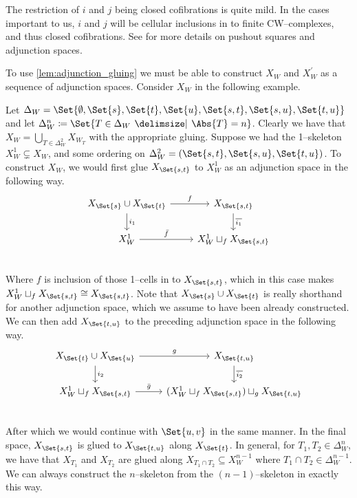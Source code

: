 \documentclass[class=article, crop=false]{standalone}
\begin{document}
The restriction of $i$ and $j$ being closed cofibrations is quite mild. In the cases important to us, $i$ and $j$ will be cellular inclusions in to finite CW--complexes, and thus closed cofibrations. See \cite{brown_topology_2006} for more details on pushout squares and adjunction spaces.

To use \cref{lem:adjunction_gluing} we must be able to construct $X_W$ and $X_W^\prime$ as a sequence of adjunction spaces. Consider $X_W$ in the following example.

\begin{example}
    \label{eg:inductive_construction}
    Let $\Delta_W = \Set{\emptyset, \Set{s}, \Set{t}, \Set{u}, \Set{s,t}, \Set{s,u}, \Set{t,u}}$ and let $\Delta_W^n \coloneq \Set{T \in \Delta_W \given \Abs{T} = n }$. Clearly we have that $X_W = \bigcup_{T \in \Delta_W^2} X_{W_T}$ with the appropriate gluing. Suppose we had the 1--skeleton $X^1_W \subsetneq X_W$, and some ordering on $\Delta_W^2 = (\Set{s,t}, \Set{s,u}, \Set{t,u})$. To construct $X_W$, we would first glue $X_{\Set{s,t}}$ to $X_W^1$ as an adjunction space in the following way.
    \begin{equation*}
        \begin{tikzcd}
                X_{\Set{s}} \cup X_{\Set{t}} \ar[r, "f" ] \ar[d, "i_1"]   &   X_{\Set{s,t}}  \ar[d, "\overline{i_1}"]    \\
                X_W^1 \ar[r, "\bar{f}"]                                 &   X^1_W \sqcup_f X_{\Set{s,t}}            \\
        \end{tikzcd}
    \end{equation*}
    Where $f$ is inclusion of those 1--cells in to $X_{\Set{s,t}}$, which in this case makes $X^1_W \sqcup_f X_{\Set{s,t}} \cong X_{\Set{s,t}}$. Note that $ X_{\Set{s}} \cup X_{\Set{t}}$ is really shorthand for another adjunction space, which we assume to have been already constructed.
    We can then add $X_{\Set{t,u}}$ to the preceding adjunction space in the following way.
    \begin{equation}
        \begin{tikzcd}
                X_{\Set{t}} \cup X_{\Set{u}} \ar[r, "g" ] \ar[d, "i_2"]   &   X_{\Set{t,u}}  \ar[d, "\overline{i_2}"]    \\
                X^1_W \sqcup_f X_{\Set{s,t}} \ar[r, "\bar{g}"]            &   (X^1_W \sqcup_f X_{\Set{s,t}}) \sqcup_g X_{\Set{t,u}}            \\
        \end{tikzcd}
        \label{eqn:inductive_gluing_step_2}
    \end{equation}
    After which we would continue with $\Set{u,v}$ in the same manner. In the final space, $X_{\Set{s,t}}$ is glued to $X_{\Set{t,u}}$ along $X_{\Set{t}}$. In general, for $T_1,T_2 \in \Delta_W^n$, we have that $X_{T_1}$ and $X_{T_2}$ are glued along $X_{T_1 \cap T_2} \subseteq X^{n-1}_W$ where $T_1 \cap T_2 \in \Delta_W^{n-1}$. We can always construct the $n$--skeleton from the $(n-1)$--skeleton in exactly this way. 
\end{example}
\end{document}
